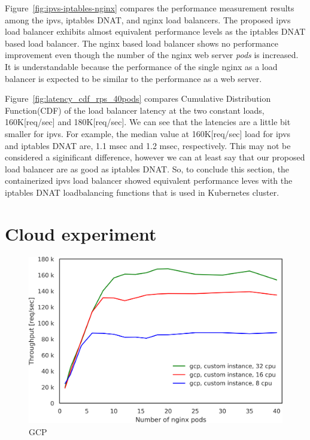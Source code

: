 Figure~\ref{fig:ipvs-iptables-nginx} compares the performance measurement results among the ipvs, iptables DNAT, and nginx load balancers.
The proposed ipvs load balancer exhibits almost equivalent performance levels as the iptables DNAT based load balancer. 
The nginx based load balancer shows no performance improvement even though the number of the nginx web server {\em pods} is increased.
It is understandable because the performance of the single nginx as a load balancer is expected to be similar to the performance as a web server.

Figure~\ref{fig:latency_cdf_rps_40pods} compares Cumulative Distribution Function(CDF) of the load balancer latency at the two constant loads, 160K[req/sec] and 180K[req/sec].
We can see that the latencies are a little bit smaller for ipvs.
For example, the median value at 160K[req/sec] load for ipvs and iptables DNAT are, 1.1 msec and 1.2 msec, respectively.
This may not be considered a siginificant difference, however we can at least say that our proposed load balancer are as good as iptables DNAT.
So, to conclude this section, the containerized ipvs load balancer showed equivalent performance leves with the iptables DNAT loadbalancing functions that is used in Kubernetes cluster.

\FloatBarrier

\section{Cloud experiment}

\begin{figure}[t]
  \centering
  \includegraphics[width=0.8\columnwidth]{Figs/gcp_all_tp}
  \caption{GCP}
  \label{fig:gcp_all_ieice}
\end{figure}

